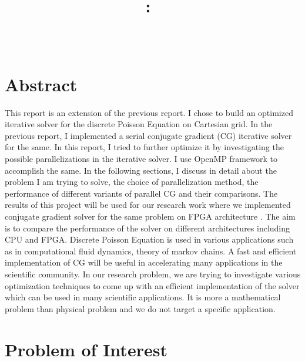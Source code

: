 \documentclass{article}
\title{\vspace{2in}\textmd{\textbf{\hmwkClass:\ \hmwkTitle}} \\
\vspace{0.1in}\large{ \hmwkClassTime}\vspace{3in}}
\author{\textbf{\hmwkAuthorName} \\ \vspace{0.1in}
\hmwkDueDate }
\date{} %
\begin{document}
\begin{spacing}{1.1}
\maketitle

\newpage
\section*{Abstract}

This report is an extension of the previous report. I chose to build an optimized iterative solver for the discrete Poisson Equation on Cartesian grid. In the previous report, I implemented a serial conjugate gradient (CG) iterative solver for the same. In this report, I tried to further optimize it by investigating the possible parallelizations in the iterative solver. I use OpenMP framework to accomplish the same. In the following sections, I discuss in detail about the problem I am trying to solve, the choice of parallelization method, the performance of different variants of parallel CG and their comparisons. The results of this project will be used for our research work where we implemented conjugate gradient solver for the same problem on FPGA architecture \cite{FPGACG}. The aim is to compare the performance of the solver on different architectures including CPU and FPGA. Discrete Poisson Equation is used in various applications such as in computational fluid dynamics, theory of markov chains. A fast and efficient implementation of CG will be useful in accelerating many applications in the scientific community. In our research problem, we are trying to investigate various optimization techniques to come up with an efficient implementation of the solver which can be used in many scientific applications. It is more a mathematical problem than physical problem and we do not target a specific application.
  

\section{Problem of Interest}


\end{spacing}
\end{document}

